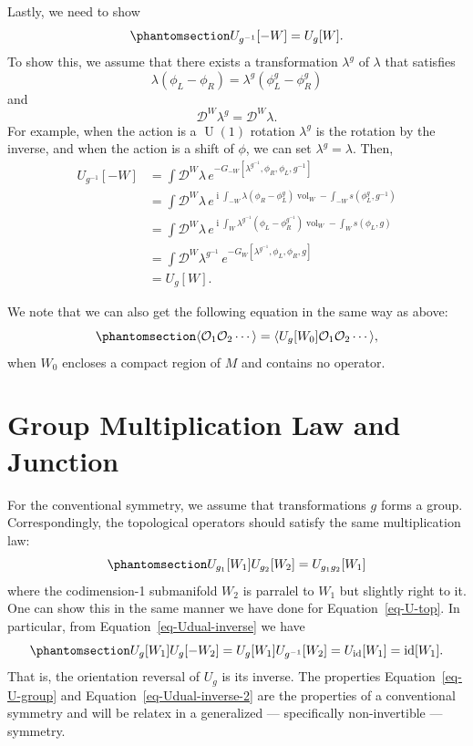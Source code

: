 \documentclass[
  letterpaper,
  DIV=11,
  numbers=noendperiod]{scrreport}
\DeclareMathOperator{\vol}{vol}
\DeclareMathOperator{\U}{U}
\DeclareMathOperator{\imunit}{i}
\DeclareMathOperator{\id}{id}
\begin{document}
Lastly, we need to show
\begin{equation}\phantomsection\label{eq-Udual-inverse}{ U_{g^{-1}}[-W] = U_g[W].
}\end{equation} To show this, we assume that there exists a
transformation \(\lambda^g\) of \(\lambda\) that satisfies
\[ \lambda(\phi_L-\phi_R) = \lambda^{g}(\phi_L^{g}-\phi_R^{g})
\] and \[ \mathcal{D}^W\lambda^g = \mathcal{D}^W\lambda. 
\] For example, when the action is a \(\U(1)\) rotation \(\lambda^g\) is
the rotation by the inverse, and when the action is a shift of \(\phi\),
we can set \(\lambda^g = \lambda\). Then, \[
\begin{split}
U_{g^{-1}}[-W] &= \int\mathcal{D}^W \lambda \, e^{-G_{-W}[\lambda^{g^{-1}},\phi_R,\phi_L,g^{-1}]}\\
&= \int\mathcal{D}^W \lambda \, e^{\imunit\int_{-W}\lambda(\phi_R-\phi_L^{g})\vol_W - \int_{-W}s(\phi_L^{g},g^{-1})}\\
&= \int\mathcal{D}^W \lambda \, e^{\imunit\int_{W}\lambda^{g^{-1}}(\phi_L-\phi_R^{g^{-1}})\vol_W - \int_{W}s(\phi_L,g)}\\
&= \int\mathcal{D}^W \lambda^{g^{-1}} \, e^{-G_W[\lambda^{g^{-1}},\phi_L,\phi_R,g]}\\
&= U_g[W].
\end{split}
\]

We note that we can also get the following equation in the same way as
above: \begin{equation}\phantomsection\label{eq-bubble}{
\langle \mathcal{O}_1 \mathcal{O}_2 \cdots \rangle = \langle U_g[W_0] \mathcal{O}_1 \mathcal{O}_2 \cdots \rangle,
}\end{equation} when \(W_0\) encloses a compact region of \(M\) and
contains no operator.

\section{Group Multiplication Law and
Junction}\label{sec-scalar-junction}

For the conventional symmetry, we assume that transformations \(g\)
forms a group. Correspondingly, the topological operators should satisfy
the same multiplication law:
\begin{equation}\phantomsection\label{eq-U-group}{
U_{g_1}[W_1] U_{g_2}[W_2] = U_{g_1g_2}[W_1]
}\end{equation} where the codimension-1 submanifold \(W_2\) is parralel
to \(W_1\) but slightly right to it. One can show this in the same
manner we have done for Equation~\ref{eq-U-top}. In particular, from
Equation~\ref{eq-Udual-inverse} we have
\begin{equation}\phantomsection\label{eq-Udual-inverse-2}{ U_g[W_1] U_g[-W_2] = U_g[W_1] U_{g^{-1}}[W_2] = U_{\id}[W_1] = \id[W_1].
}\end{equation} That is, the orientation reversal of \(U_g\) is its
inverse. The properties Equation~\ref{eq-U-group} and
Equation~\ref{eq-Udual-inverse-2} are the properties of a conventional
symmetry and will be relatex in a generalized --- specifically
non-invertible --- symmetry.
\end{document}
